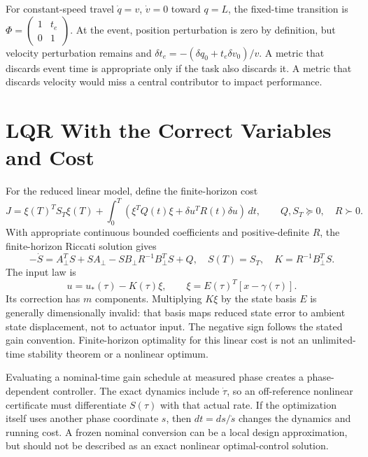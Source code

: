 \documentclass[12pt, openany]{book}
\theoremstyle{plain}
\begin{document}
For constant-speed travel $\dot q=v$, $\dot v=0$ toward $q=L$, the fixed-time
transition is $\Phi=\left(\begin{smallmatrix}1&t_e\\0&1\end{smallmatrix}\right)$.
At the event, position perturbation is zero by definition, but velocity
perturbation remains and
$\delta t_e=-(\delta q_0+t_e\delta v_0)/v$. A metric that discards event
time is appropriate only if the task also discards it. A metric that discards
velocity would miss a central contributor to impact performance.

\section{LQR With the Correct Variables and Cost}

For the reduced linear model, define the finite-horizon cost
\begin{equation}\label{eq:orbital_lqr_cost}
 J=\xi(T)^TS_T\xi(T)+\int_0^T
       (\xi^TQ(t)\xi+\delta u^TR(t)\delta u)\,dt,
 \qquad Q,S_T\succeq0,\quad R\succ0.
\end{equation}
With appropriate continuous bounded coefficients and positive-definite $R$,
the finite-horizon Riccati solution gives
\begin{equation}\label{eq:riccati}
 -\dot S=A_\perp^TS+SA_\perp-SB_\perp R^{-1}B_\perp^TS+Q,
 \quad S(T)=S_T,\quad K=R^{-1}B_\perp^TS.
\end{equation}
The input law is
\begin{equation}\label{eq:full_control_law}
 u=u_*(\tau)-K(\tau)\xi,\qquad
 \xi=E(\tau)^T[x-\gamma(\tau)].
\end{equation}
Its correction has $m$ components. Multiplying $K\xi$ by the state basis
$E$ is generally dimensionally invalid: that basis maps reduced state error
to ambient state displacement, not to actuator input. The negative sign
follows the stated gain convention. Finite-horizon optimality for this linear
cost is not an unlimited-time stability theorem or a nonlinear optimum.

Evaluating a nominal-time gain schedule at measured phase creates a
phase-dependent controller. The exact dynamics include $\dot\tau$, so an
off-reference nonlinear certificate must differentiate $S(\tau)$ with that
actual rate. If the optimization itself uses another phase coordinate $s$,
then $dt=ds/\dot s$ changes the dynamics and running cost. A frozen nominal
conversion can be a local design approximation, but should not be described
as an exact nonlinear optimal-control solution.
\end{document}
